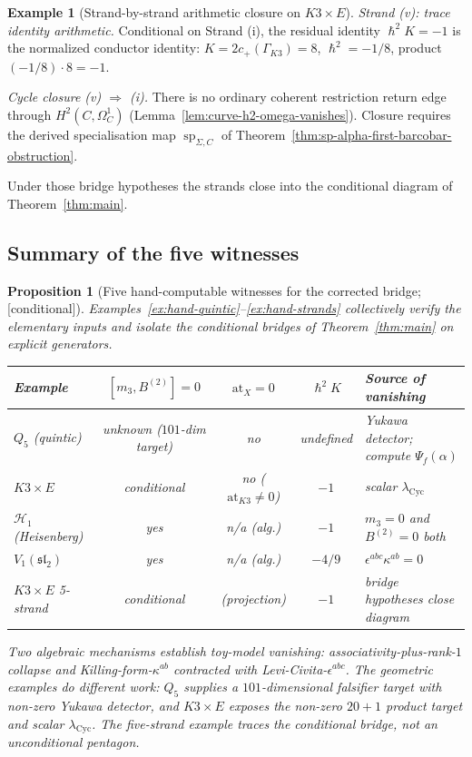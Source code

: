 \documentclass[11pt,reqno]{amsart}
\theoremstyle{plain}
\newtheorem{proposition}[theorem]{Proposition}
\theoremstyle{definition}
\newtheorem{example}[theorem]{Example}
\theoremstyle{remark}
\providecommand{\ClaimStatusConditional}{\textnormal{[conditional]}}
\newcommand{\cH}{\mathcal{H}}
\newcommand{\at}{\mathrm{at}}
\newcommand{\hbar}{{\hslash}}
\begin{document}
\begin{example}[Strand-by-strand arithmetic closure on $K3 \times E$]
\emph{Strand (v): trace identity arithmetic.} Conditional on Strand (i), the residual identity $\hbar^2 K = -1$ is the normalized conductor identity: $K = 2 c_+(\Gamma_{K3}) = 8$, $\hbar^2 = -1/8$, product $(-1/8) \cdot 8 = -1$.

\emph{Cycle closure (v) $\Rightarrow$ (i).} There is no ordinary coherent restriction return edge through $H^2(C,\Omega^1_C)$ (Lemma~\ref{lem:curve-h2-omega-vanishes}). Closure requires the derived specialisation map $\operatorname{sp}_{\Sigma,C}$ of Theorem~\ref{thm:sp-alpha-first-barcobar-obstruction}.

Under those bridge hypotheses the strands close into the conditional diagram of Theorem~\ref{thm:main}.
\end{example}

\subsection{Summary of the five witnesses}
\label{sub:hand-summary}

\begin{proposition}[Five hand-computable witnesses for the corrected bridge; \ClaimStatusConditional]
\label{prop:hand-summary}
Examples~\ref{ex:hand-quintic}--\ref{ex:hand-strands} collectively verify the elementary inputs and isolate the conditional bridges of Theorem~\ref{thm:main} on explicit generators.
\begin{center}
\begin{tabular}{l c c c l}
\toprule
Example & $[m_3, B^{(2)}] = 0$ & $\at_X = 0$ & $\hbar^2 K$ & Source of vanishing \\
\midrule
$Q_5$ (quintic) & unknown ($101$-dim target) & no & undefined & Yukawa detector; compute $\Psi_f(\alpha)$ \\
$K3 \times E$ & conditional & no ($\at_{K3} \neq 0$) & $-1$ & scalar $\lambda_{\mathrm{Cyc}}$ \\
$\cH_1$ (Heisenberg) & yes & n/a (alg.) & $-1$ & $m_3 = 0$ and $B^{(2)} = 0$ both \\
$V_1(\mathfrak{sl}_2)$ & yes & n/a (alg.) & $-4/9$ & $\epsilon^{abc} \kappa^{ab} = 0$ \\
$K3 \times E$ 5-strand & conditional & (projection) & $-1$ & bridge hypotheses close diagram \\
\bottomrule
\end{tabular}
\end{center}

Two algebraic mechanisms establish toy-model vanishing:
associativity-plus-rank-$1$ collapse and Killing-form-$\kappa^{ab}$
contracted with Levi-Civita-$\epsilon^{abc}$. The geometric examples
do different work: $Q_5$ supplies a $101$-dimensional falsifier target
with non-zero Yukawa detector, and $K3\times E$ exposes the non-zero
$20+1$ product target and scalar $\lambda_{\mathrm{Cyc}}$. The
five-strand example traces the conditional bridge, not an unconditional
pentagon.
\end{proposition}
\end{document}
